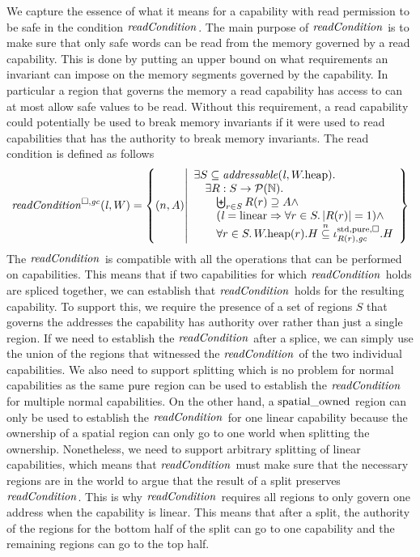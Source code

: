 \begin{jversion}
We capture the essence of what it means for a capability with read permission to be safe in the condition $\readCond[]{}$.
The main purpose of $\readCond[]{}$ is to make sure that only safe words can be read from the memory governed by a read capability.
This is done by putting an upper bound on what requirements an invariant can impose on the memory segments governed by the capability.
In particular a region that governs the memory a read capability has access to can at most allow safe values to be read.
Without this requirement, a read capability could potentially be used to break memory invariants if it were used to read capabilities that has the authority to break memory invariants.
The read condition is defined as follows
\[
  \readCond{\lin,W} = \left\{ \npair{A} \middle| 
    \begin{array}{l}
      \exists S \subseteq \addressable{\lin, \pwheap} \ldotp \\
      \quad \exists R : S \fun \powerset{\nats} \ldotp\\
      \qquad \biguplus_{r\in S} R(r) \supseteq A \wedge\\
      \qquad (\lin = \linear \Rightarrow \forall r \in S \ldotp |R(r)|  = 1) \wedge\\
      \qquad \forall r \in S \ldotp \pwheap(r).H \nsubeq \stdreg{R(r),\gc}{\pure}.H
    \end{array}
  \right\}
\]
The $\readCond[]{}$ is compatible with all the operations that can be performed on capabilities.
This means that if two capabilities for which $\readCond[]{}$ holds are spliced together, we can establish that $\readCond[]{}$ holds for the resulting capability.
To support this, we require the presence of a set of regions $S$ that governs the addresses the capability has authority over rather than just a single region.
If we need to establish the $\readCond[]{}$ after a splice, we can simply use the union of the regions that witnessed the $\readCond[]{}$ of the two individual capabilities.
We also need to support splitting which is no problem for normal capabilities as the same $\mathrm{pure}$ region can be used to establish the $\readCond[]{}$ for multiple normal capabilities.
On the other hand, a $\mathrm{spatial\_owned}$ region can only be used to establish the $\readCond[]{}$ for one linear capability because the ownership of a spatial region can only go to one world when splitting the ownership.
Nonetheless, we need to support arbitrary splitting of linear capabilities, which means that $\readCond[]{}$ must make sure that the necessary regions are in the world to argue that the result of a split preserves $\readCond[]{}$.
This is why $\readCond[]{}$ requires all regions to only govern one address when the capability is linear.
This means that after a split, the authority of the regions for the bottom half of the split can go to one capability and the remaining regions can go to the top half.


\end{jversion}
